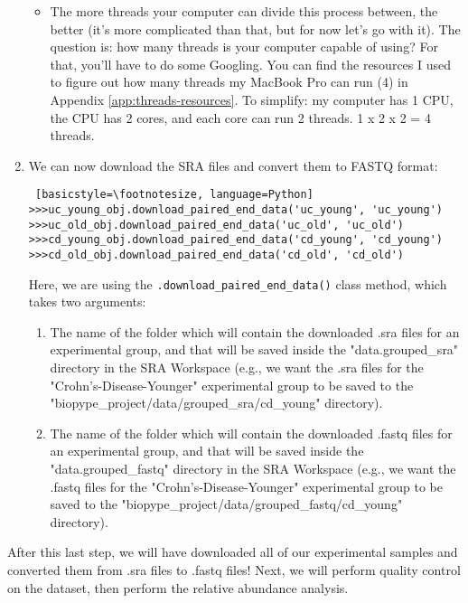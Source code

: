 \begin{enumerate}
            \begin{itemize}
	   \item The more threads your computer can divide this process between, the better (it's more complicated than that, but for now let's go with it). The question is: how many threads is your computer capable of using? For that, you'll have to do some Googling. You can find the resources I used to figure out how many threads my MacBook Pro can run (4) in Appendix \ref{app:threads-resources}. To simplify: my computer has 1 CPU, the CPU has 2 cores, and each core can run 2 threads. 1 x 2 x 2 = 4 threads.
	   \end{itemize}
%            
            \item {} We can now download the SRA files and convert them to FASTQ format:
            \begin{lstlisting} [basicstyle=\footnotesize, language=Python]
>>>uc_young_obj.download_paired_end_data('uc_young', 'uc_young')
>>>uc_old_obj.download_paired_end_data('uc_old', 'uc_old')
>>>cd_young_obj.download_paired_end_data('cd_young', 'cd_young')
>>>cd_old_obj.download_paired_end_data('cd_old', 'cd_old')
            \end{lstlisting}
             Here, we are using the \verb|.download_paired_end_data()| class method, which takes two arguments:
            \begin{enumerate}
            \item The name of the folder which will contain the downloaded .sra files for an experimental group, and that will be saved inside the "data.grouped\_sra" directory in the SRA Workspace (e.g., we want the .sra files for the "Crohn's-Disease-Younger" experimental group to be saved to the \newline "biopype\_project/data/grouped\_sra/cd\_young" directory).
            \item The name of the folder which will contain the downloaded .fastq files for an experimental group, and that will be saved inside the "data.grouped\_fastq" directory in the SRA Workspace (e.g., we want the .fastq files for the "Crohn's-Disease-Younger" experimental group to be saved to the \newline "biopype\_project/data/grouped\_fastq/cd\_young" directory).
            \end{enumerate}
            
        \end{enumerate}
        
After this last step, we will have downloaded all of our experimental samples and converted them from .sra files to .fastq files! Next, we will perform quality control on the dataset, then perform the relative abundance analysis.
